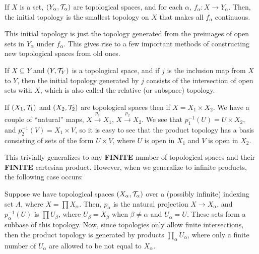 \begin{definition}
    If $X$ is a set, $(Y_\alpha, \mathcal T_\alpha)$ are topological spaces, and for each $\alpha$, $f_\alpha\colon X \to Y_\alpha$. Then, the initial topology is the smallest topology on $X$ that makes all $f_\alpha$ continuous.
\end{definition}

This initial topology is just the topology generated from the preimages of open sets in $Y_\alpha$ under $f_\alpha$. This gives rise to a few important methods of constructing new topological spaces from old ones.

\begin{definition}
    If $X \subseteq Y$ and $(Y, \mathcal T_Y)$ is a topological space, and if $j$ is the inclusion map from $X$ to $Y$, then the initial topology generated by $j$ consists of the intersection of open sets with $X$, which is also called the relative (or subspace) topology. 
\end{definition}

\begin{definition}
    If $(X_1, \mathcal T_1)$ and $(X_2, \mathcal T_2)$ are topological spaces then if $X = X_1 \times X_2$. We have a couple of ``natural'' maps, $X \xrightarrow{p_1} X_1$, $X \xrightarrow{p_2} X_2$. We see that $p_1^{-1}(U) = U \times X_2$, and $p_2^{-1}(V) = X_1 \times V$, so it is easy to see that the product topology has a basis consisting of sets of the form $U \times V$, where $U$ is open in $X_1$ and $V$ is open in $X_2$.

    This trivially generalizes to any {\bfseries FINITE} number of topological spaces and their {\bfseries FINITE} cartesian product. However, when we generalize to infinite products, the following case occurs:
\end{definition}

\begin{definition}
    Suppose we have topological spaces $(X_\alpha, \mathcal T_\alpha)$ over a (possibly infinite) indexing set $A$, where $X = \prod X_\alpha$. Then, $p_\alpha$ is the natural projection $X \to X_\alpha$, and $p_\alpha^{-1}(U)$ is $\prod U_\beta$, where $U_\beta = X_\beta$ when $\beta \ne \alpha$ and $U_\alpha = U$. These sets form a subbase of this topology. Now, since topologies only allow finite intersections, then the product topology is generated by products $\prod_\alpha U_\alpha$, where only a finite number of $U_\alpha$ are allowed to be not equal to $X_\alpha$.
\end{definition}

